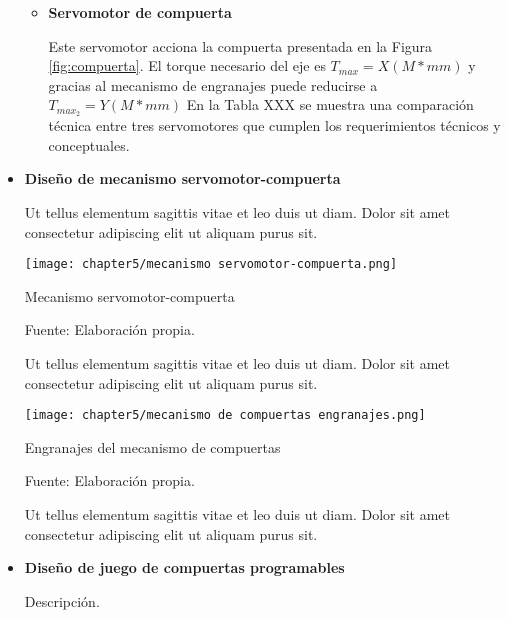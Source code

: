 \begin{itemize}
	\begin{itemize}
		
		
		\item \textbf{Servomotor de compuerta}
		
		Este servomotor acciona la compuerta presentada en la Figura \ref{fig:compuerta}. El torque necesario del eje es $T_{max}=X (M*mm)$  y gracias al mecanismo de engranajes puede reducirse a $T_{max_2}=Y (M*mm)$ En la Tabla XXX se muestra una comparación técnica entre tres servomotores que cumplen los requerimientos técnicos y conceptuales.
		
	\end{itemize}


	\item \textbf{Diseño de mecanismo servomotor-compuerta} 
	
	Ut tellus elementum sagittis vitae et leo duis ut diam. Dolor sit amet consectetur adipiscing elit ut aliquam purus sit. 
	
	\begin{myfigure}[H]
		\centering
		\texttt{[image: chapter5/mecanismo servomotor-compuerta.png]}
		\caption{Mecanismo servomotor-compuerta}
		\begin{myflushleftportland}
			Fuente: Elaboración propia.
		\end{myflushleftportland}
		\label{fig:mecanismo servomotor-compuerta}
	\end{myfigure}
	
	Ut tellus elementum sagittis vitae et leo duis ut diam. Dolor sit amet consectetur adipiscing elit ut aliquam purus sit. 
	
	\begin{myfigure}[H]
		\centering
		\texttt{[image: chapter5/mecanismo de compuertas engranajes.png]}
		\caption{Engranajes del mecanismo de compuertas}
		\begin{myflushleftportland}
			Fuente: Elaboración propia.
		\end{myflushleftportland}
		\label{fig:mecanismo de compuertas engranajes}
	\end{myfigure}
	
	Ut tellus elementum sagittis vitae et leo duis ut diam. Dolor sit amet consectetur adipiscing elit ut aliquam purus sit. 
	
	
	\item \textbf{Diseño de juego de compuertas programables}
	
	Descripción.

\end{itemize}



